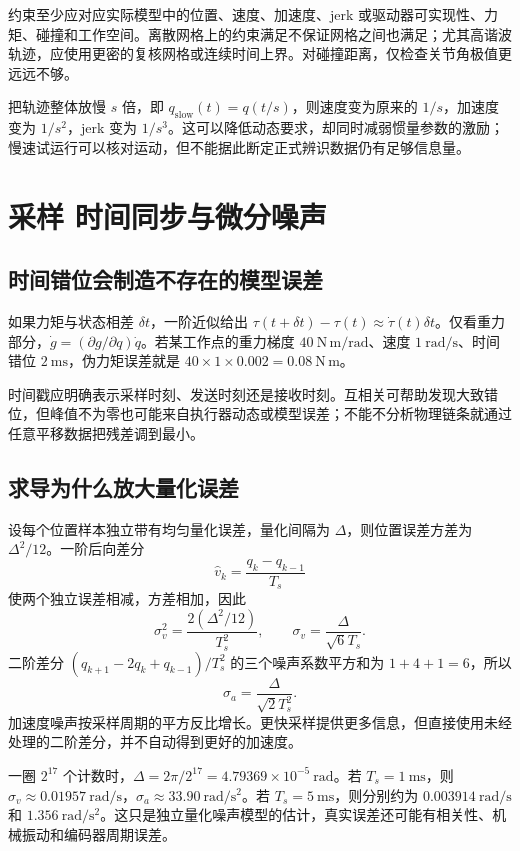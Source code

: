约束至少应对应实际模型中的位置、速度、加速度、jerk 或驱动器可实现性、力矩、碰撞和工作空间。离散网格上的约束满足不保证网格之间也满足；尤其高谐波轨迹，应使用更密的复核网格或连续时间上界。对碰撞距离，仅检查关节角极值更远远不够。

把轨迹整体放慢 $s$ 倍，即 $q_{\mathrm{slow}}(t)=q(t/s)$，则速度变为原来的 $1/s$，加速度变为 $1/s^2$，jerk 变为 $1/s^3$。这可以降低动态要求，却同时减弱惯量参数的激励；慢速试运行可以核对运动，但不能据此断定正式辨识数据仍有足够信息量。

\section{采样 时间同步与微分噪声}
\subsection{时间错位会制造不存在的模型误差}
如果力矩与状态相差 $\delta t$，一阶近似给出 $\tau(t+\delta t)-\tau(t)\approx\dot\tau(t)\delta t$。仅看重力部分，$\dot g=(\partial g/\partial q)\dot q$。若某工作点的重力梯度 $40\ \mathrm{N\,m/rad}$、速度 $1\ \mathrm{rad/s}$、时间错位 $2\ \mathrm{ms}$，伪力矩误差就是 $40\times1\times0.002=0.08\ \mathrm{N\,m}$。

时间戳应明确表示采样时刻、发送时刻还是接收时刻。互相关可帮助发现大致错位，但峰值不为零也可能来自执行器动态或模型误差；不能不分析物理链条就通过任意平移数据把残差调到最小。

\subsection{求导为什么放大量化误差}
设每个位置样本独立带有均匀量化误差，量化间隔为 $\Delta$，则位置误差方差为 $\Delta^2/12$。一阶后向差分
\[
 \hat v_k=\frac{q_k-q_{k-1}}{T_s}
\]
使两个独立误差相减，方差相加，因此
\[
 \sigma_v^2=\frac{2(\Delta^2/12)}{T_s^2},\qquad
 \sigma_v=\frac{\Delta}{\sqrt6T_s}.
\]
二阶差分 $(q_{k+1}-2q_k+q_{k-1})/T_s^2$ 的三个噪声系数平方和为 $1+4+1=6$，所以
\[
 \sigma_a=\frac{\Delta}{\sqrt2T_s^2}.
\]
加速度噪声按采样周期的平方反比增长。更快采样提供更多信息，但直接使用未经处理的二阶差分，并不自动得到更好的加速度。

\begin{examplebox}[算例 9B 十七位编码器的差分误差量级]
一圈 $2^{17}$ 个计数时，$\Delta=2\pi/2^{17}=4.79369\times10^{-5}\ \mathrm{rad}$。若 $T_s=1\ \mathrm{ms}$，则 $\sigma_v\approx0.01957\ \mathrm{rad/s}$，$\sigma_a\approx33.90\ \mathrm{rad/s^2}$。若 $T_s=5\ \mathrm{ms}$，则分别约为 $0.003914\ \mathrm{rad/s}$ 和 $1.356\ \mathrm{rad/s^2}$。这只是独立量化噪声模型的估计，真实误差还可能有相关性、机械振动和编码器周期误差。
\end{examplebox}

